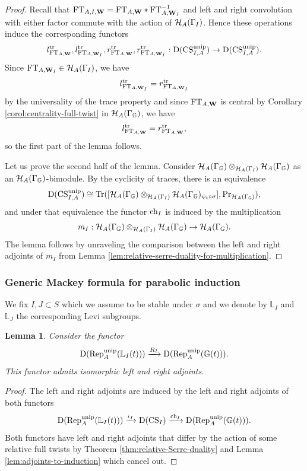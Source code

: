 \documentclass[a4paper, 10pt, oneside, reqno]{amsart}
\theoremstyle{plain}
\newtheorem{lem}[thm]{Lemma}
\theoremstyle{definition}
\theoremstyle{remark}
\newcommand{\Gbb}{\mathbb{G}}
\newcommand{\Prr}{\mathrm{Pr}}
\newcommand{\FT}{\mathrm{FT}}
\newcommand{\Lbb}{\mathbb{L}}
\begin{document}
\begin{proof}
Recall that $\FT_{A,I,\Wbf} = \FT_{A,\Wbf} * \FT_{A,\Wbf_I}^{-1}$ and left and right convolution with either factor commute with the action of $\mathcal{H}_{A}(\Gamma_{I})$. Hence these operations induce the corresponding functors 
$$l^{\tr}_{\FT_{A,\Wbf}}, l^{\tr}_{\FT_{A,\Wbf_I}}, r^{\tr}_{\FT_{A,\Wbf}}, r^{\tr}_{\FT_{A,\Wbf_I}}: \DD(\CS_{I,A}^{\unip}) \to \DD(\CS_{I,A}^{\unip}).$$
Since $\FT_{A,\Wbf_I} \in \Hcal_{A}(\Gamma_I)$, we have 
$$l^{\tr}_{\FT_{A,\Wbf_I}} = r^{\tr}_{\FT_{A,\Wbf_I}}$$
by the universality of the trace property and since $\FT_{A,\Wbf}$ is central by Corollary \ref{corol:centrality-full-twist} in $\Hcal_{A}(\Gamma_{\Gbb})$, we have 
$$l^{\tr}_{\FT_{A,\Wbf}} = r^{\tr}_{\FT_{A,\Wbf}},$$
so the first part of the lemma follows.

Let us prove the second half of the lemma. Consider $\Hcal_{A}(\Gamma_{\Gbb}) \otimes_{\Hcal_A(\Gamma_I)} \Hcal_{A}(\Gamma_{\Gbb})$ as an $\Hcal_{A}(\Gamma_{\Gbb})$-bimodule. By the cyclicity of traces, there is an equivalence 
$$\DD(\CS_{I,A}^{\unip}) \cong \Tr([\Hcal_{A}(\Gamma_{\Gbb}) \otimes_{\Hcal_A(\Gamma_I)} \Hcal_{A}(\Gamma_{\Gbb})_{\psi_t \circ \sigma}], \Prr_{\Hcal_A(\Gamma_{\Gbb})}),$$
and under that equivalence the functor $\mathrm{ch}_I$ is induced by the multiplication 
$$m_I : \Hcal_{A}(\Gamma_{\Gbb}) \otimes_{\Hcal_A(\Gamma_I)} \Hcal_{A}(\Gamma_{\Gbb}) \to \Hcal_A(\Gamma_{\Gbb}).$$
The lemma follows by unraveling the comparison between the left and right adjoints of $m_I$ from Lemma \ref{lem:relative-serre-duality-for-multiplication}.
\end{proof}

\subsubsection{Generic Mackey formula for parabolic induction}\label{ssec:mackay-formula}

We fix $I,J \subset S$ which we assume to be stable under $\sigma$ and we denote by $\Lbb_I$ and $\Lbb_J$ the corresponding Levi subgroups. 

\begin{lem}\label{lem:parab-reduction}
Consider the functor 
$$\DD(\Rep_A^{\unip}(\Lbb_I(t))) \xrightarrow{R_I} \DD(\Rep_A^{\unip}(\Gbb(t))).$$
This functor admits isomorphic left and right adjoints.
\end{lem}

\begin{proof}
The left and right adjoints are induced by the left and right adjoints of both functors 
$$\DD(\Rep_A^{\unip}(\Lbb_I(t))) \xrightarrow{\iota_{I}} \DD(\CS_I) \xrightarrow{\ch_I} \DD(\Rep^{\unip}_A(\Gbb(t))).$$
Both functors have left and right adjoints that differ by the action of some relative full twists by Theorem \ref{thm:relative-Serre-duality} and Lemma \ref{lem:adjoints-to-induction} which cancel out. 
\end{proof}
\end{document}
